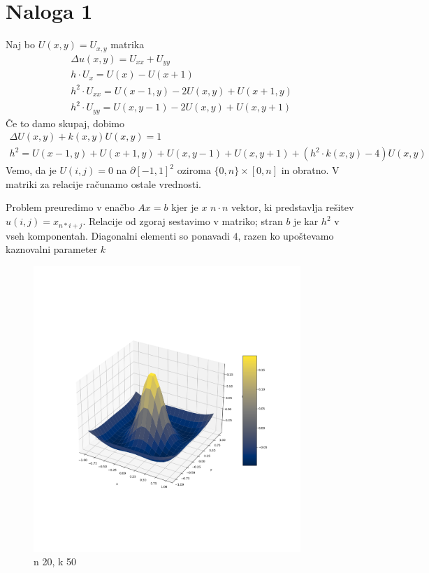\documentclass{article}
\begin{document}
\section{Naloga 1}
    Naj bo \(U(x,y) = U_{x,y}\) matrika
    \begin{align*}
        \Delta u(x,y) = U_{xx} + U_{yy}\\
        h\cdot U_x = U(x) - U(x+1)\\
        h^2\cdot U_{xx} = U(x-1, y) - 2U(x,y) + U(x+1,y)\\
        h^2\cdot U_{yy} = U(x, y-1) - 2U(x,y) + U(x, y+1)
    \end{align*}
    Če to damo skupaj, dobimo
    \begin{align*}
        \Delta U(x,y) + k(x,y)U(x,y) = 1\\
        h^2 = U(x-1,y)+U(x+1,y)+U(x,y-1)+U(x,y+1) + (h^2\cdot k(x,y)- 4) U(x,y)
    \end{align*}
    Vemo, da je \(U(i,j)=0\) na \(\partial [-1,1]^2\) oziroma \(\{0,n\}\times [0,n]\) in obratno. V matriki za relacije računamo ostale vrednosti.
    
    Problem preuredimo v enačbo \(Ax=b\) kjer je \(x\) \(n\cdot n\) vektor, ki predstavlja rešitev \(u(i,j) = x_{n*i+j}\). Relacije od zgoraj sestavimo v matriko; stran \(b\) je kar \(h^2\) v vseh komponentah. Diagonalni elementi so ponavadi \(4\), razen ko upoštevamo kaznovalni parameter \(k\)

    \begin{figure}[h]
        \centering
        \includegraphics[width=0.9\textwidth]{nal1_n20_k50.png}
        \caption{n 20, k 50}
    \end{figure}
\end{document}
